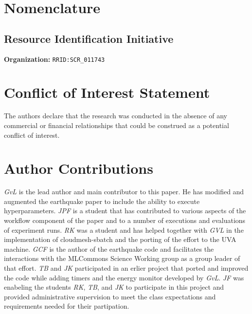 \documentclass[utf8]{FrontiersinVancouver} %
\newcommand{\TODO}[1]{\todo[inline]{#1}}
\begin{document}

\clearpage

\section{Nomenclature}

\subsection{Resource Identification Initiative}

{\bf Organization:} \verb|RRID:SCR_011743|

\section*{Conflict of Interest Statement}

The authors declare that the research was conducted in the absence of
any commercial or financial relationships that could be construed as a
potential conflict of interest.

\section*{Author Contributions}

{\em GvL} is the lead author and main contributor to this paper. He
has modified and augmented the earthquake paper to include the ability
to execute hyperparameters. {\em JPF} is a student that has
contributed to various aspects of the workflow component of the paper
and to a number of executions and evaluations of experiment runs. {\em
  RK} was a student and has helped together with {\em GVL} in the
implementation of cloudmesh-sbatch and the porting of the effort to
the UVA machine.  {\em GCF} is the author of the earthquake code and
facilitates the interactions with the MLCommons Science Working group
as a group leader of that effort. {\em TB} and {\em JK} participated
in an erlier project that ported and improved the code while adding
timers and the energy monitor developed by {\em GvL}. {\em JF} was
enabeling the students {\em RK}, {\em TB}, and {\em JK} to participate
in this project and provided administrative supervision to meet the
class expectations and requirements needed for their partipation.
\end{document}
